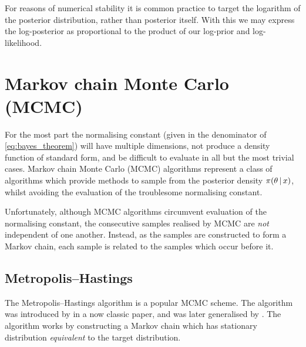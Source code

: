 For reasons of numerical stability it is common practice to target the
logarithm of the posterior distribution, rather than posterior itself. With
this we may express the log-posterior as proportional to the product of our
log-prior and log-likelihood.

\section{Markov chain Monte Carlo (MCMC)}
\label{sec:mcmc}

For the most part the normalising constant (given in the denominator of
\cref{eq:bayes_theorem}) will have multiple dimensions, not produce a density
function of standard form, and be difficult to evaluate in all but the most
trivial cases. Markov chain Monte Carlo (MCMC) algorithms represent a class of
algorithms which provide methods to sample from the posterior density
$\pi(\theta \,|\, x)$, whilst avoiding the evaluation of the troublesome
normalising constant.

Unfortunately, although MCMC algorithms circumvent evaluation of the
normalising constant, the consecutive samples realised by MCMC are \emph{not}
independent of one another. Instead, as the samples are constructed to form a
Markov chain, each sample is related to the samples which occur before it.

\subsection{Metropolis--Hastings}
\label{ssec:metropolis_hastings}

The Metropolis--Hastings algorithm is a popular MCMC scheme. The algorithm was
introduced by \textcite{metropolis53} in a now classic paper, and was later
generalised by \textcite{hastings70}. The algorithm works by constructing a
Markov chain which has stationary distribution \emph{equivalent} to the target
distribution.

